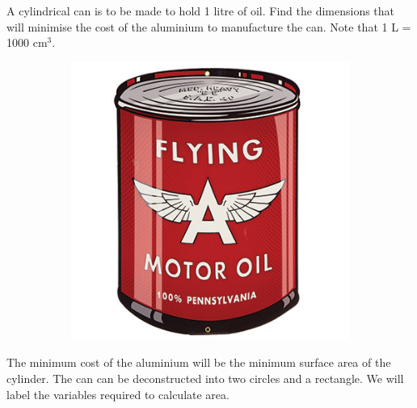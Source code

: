 \example A cylindrical can is to be made to hold 1 litre of oil. Find the dimensions that will minimise the cost of the aluminium to manufacture the can. Note that 1 L = 1000 cm$^3$.\\

\begin{figure}[h]
	\centering
	\begin{subfigure}[h]{0.4\textwidth}
		\includegraphics[width=\textwidth]{graphics/oilCan}
	\end{subfigure}
	\begin{subfigure}[h]{0.4\textwidth}
	\end{subfigure}
\end{figure}	

\solution The minimum cost of the aluminium will be the minimum surface area of the cylinder. The can can be deconstructed into two circles and a rectangle. We will label the variables required to calculate area.


